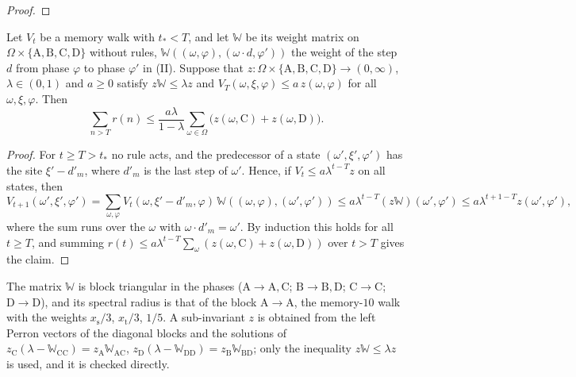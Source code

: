 \begin{proof}
\end{proof}

\begin{lemma}\label{l:remainder}
Let $V_t$ be a memory walk with $t_* < T$, and let $\mathbb W$ be its weight matrix on $\Omega \times \{\mathrm A, \mathrm B, \mathrm C, \mathrm D\}$ without rules, $\mathbb W((\omega, \varphi), (\omega \cdot d, \varphi'))$ the weight of the step $d$ from phase $\varphi$ to phase $\varphi'$ in (II). Suppose that $z \colon \Omega \times \{\mathrm A, \mathrm B, \mathrm C, \mathrm D\} \to (0, \infty)$, $\lambda \in (0, 1)$ and $a \ge 0$ satisfy $z \mathbb W \le \lambda z$ and $V_T(\omega, \xi, \varphi) \le a \, z(\omega, \varphi)$ for all $\omega, \xi, \varphi$. Then
\begin{equation*}
\sum_{n > T} r(n) \le \frac{a \lambda}{1 - \lambda} \sum_{\omega \in \Omega} \bigl( z(\omega, \mathrm C) + z(\omega, \mathrm D) \bigr).
\end{equation*}
\end{lemma}

\begin{proof}
For $t \ge T > t_*$ no rule acts, and the predecessor of a state $(\omega', \xi', \varphi')$ has the site $\xi' - d'_m$, where $d'_m$ is the last step of $\omega'$. Hence, if $V_t \le a \lambda^{t - T} z$ on all states, then
\begin{equation*}
V_{t + 1}(\omega', \xi', \varphi') = \sum_{\omega, \varphi} V_t(\omega, \xi' - d'_m, \varphi) \, \mathbb W((\omega, \varphi), (\omega', \varphi')) \le a \lambda^{t - T} (z \mathbb W)(\omega', \varphi') \le a \lambda^{t + 1 - T} z(\omega', \varphi'),
\end{equation*}
where the sum runs over the $\omega$ with $\omega \cdot d'_m = \omega'$. By induction this holds for all $t \ge T$, and summing $r(t) \le a \lambda^{t - T} \sum_\omega (z(\omega, \mathrm C) + z(\omega, \mathrm D))$ over $t > T$ gives the claim.
\end{proof}

The matrix $\mathbb W$ is block triangular in the phases ($\mathrm A \to \mathrm A, \mathrm C$; $\mathrm B \to \mathrm B, \mathrm D$; $\mathrm C \to \mathrm C$; $\mathrm D \to \mathrm D$), and its spectral radius is that of the block $\mathrm A \to \mathrm A$, the memory-$10$ walk with the weights $x_{\mathrm s}/3$, $x_{\mathrm t}/3$, $1/5$. A sub-invariant $z$ is obtained from the left Perron vectors of the diagonal blocks and the solutions of $z_{\mathrm C} (\lambda - \mathbb W_{\mathrm{CC}}) = z_{\mathrm A} \mathbb W_{\mathrm{AC}}$, $z_{\mathrm D} (\lambda - \mathbb W_{\mathrm{DD}}) = z_{\mathrm B} \mathbb W_{\mathrm{BD}}$; only the inequality $z \mathbb W \le \lambda z$ is used, and it is checked directly.

